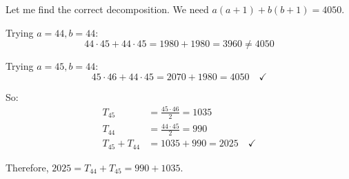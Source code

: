 \documentclass[12pt]{article}
\begin{document}
Let me find the correct decomposition. We need $a(a+1) + b(b+1) = 4050$.

Trying $a = 44, b = 44$:
\begin{equation}
44 \cdot 45 + 44 \cdot 45 = 1980 + 1980 = 3960 \neq 4050
\end{equation}

Trying $a = 45, b = 44$:
\begin{equation}
45 \cdot 46 + 44 \cdot 45 = 2070 + 1980 = 4050 \quad \checkmark
\end{equation}

So:
\begin{align*}
T_{45} &= \frac{45 \cdot 46}{2} = 1035 \\
T_{44} &= \frac{44 \cdot 45}{2} = 990 \\
T_{45} + T_{44} &= 1035 + 990 = 2025 \quad \checkmark
\end{align*}

Therefore, $\boxed{2025 = T_{44} + T_{45} = 990 + 1035}$.
\end{document}
